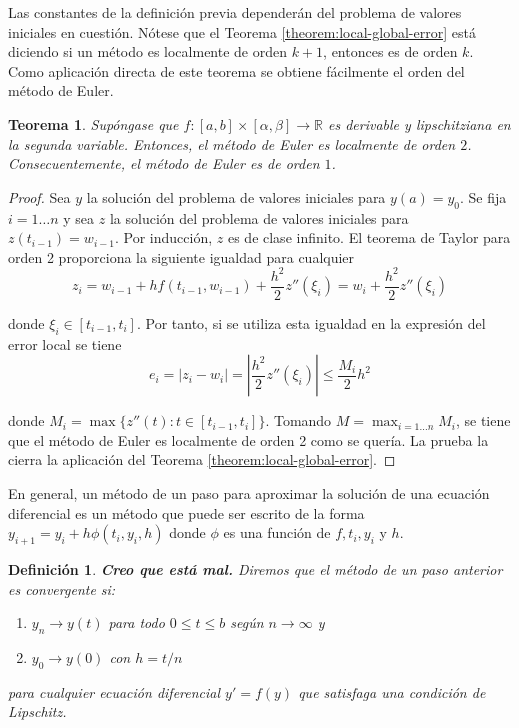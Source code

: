\documentclass{article}
\theoremstyle{theorem-style}  %
\newtheorem{theorem}{Teorema}[section]  %
\theoremstyle{definition-style}
\newtheorem{definition}{Definición}[section]
\theoremstyle{example-style}
\begin{document}
	Las constantes de la definición previa dependerán del problema de valores iniciales en cuestión. Nótese que el Teorema \ref{theorem:local-global-error} está diciendo si un método es localmente de orden $k+1$, entonces es de orden $k$. Como aplicación directa de este teorema se obtiene fácilmente el orden del método de Euler.
	
	\begin{theorem} \label{theorem:euler:error}
		Supóngase que $f: [a,b] \times [\alpha, \beta] \rightarrow \mathbb{R}$ es derivable y lipschitziana en la segunda variable. Entonces, el método de Euler es localmente de orden $2$. Consecuentemente, el método de Euler es de orden $1$.
	\end{theorem}
	
	\begin{proof}
		Sea $y$ la solución del problema de valores iniciales para $y(a) = y_0$. Se fija $i = 1 \ldots n$ y sea $z$ la solución del problema de valores iniciales para $z(t_{i-1}) = w_{i-1}$. Por inducción, $z$ es de clase infinito. El teorema de Taylor para orden 2 proporciona la siguiente igualdad para cualquier 
		\begin{equation}
			z_i= w_{i-1} + h f(t_{i-1}, w_{i-1}) + \frac{h^2}{2} z''(\xi_i) = w_i + \frac{h^2}{2} z''(\xi_i)
		\end{equation}

		donde $\xi_i \in [t_{i-1}, t_i]$. Por tanto, si se utiliza esta igualdad en la expresión del error local se tiene
		\begin{equation}
			e_i = |z_i - w_i| = \left|\frac{h^2}{2} z''(\xi_i)\right| \le \frac{M_i}{2} h^2
		\end{equation}

		donde $M_i = \max\{z''(t) : t \in [t_{i-1}, t_i]\}$. Tomando $M = \max_{i = 1 \ldots n} M_i$, se tiene que el método de Euler es localmente de orden 2 como se quería. La prueba la cierra la aplicación del Teorema \ref{theorem:local-global-error}.
	\end{proof}
	
	En general, un método de un paso para aproximar la solución de una ecuación diferencial es un método que puede ser escrito de la forma $y_{i+1}=y_i + h \phi(t_i,y_i,h)$ donde $\phi$ es una función de $f, t_i, y_i$ y $h$. 
	
	\begin{definition}
		\textbf{Creo que está mal.} Diremos que el método de un paso anterior es convergente si:
		\begin{enumerate}
			\item $y_n \to y(t)$ para todo $0 \le t \le b$ según $n \to \infty$ y 
			\item $y_0 \to y(0)$ con $h=t/n$
		\end{enumerate}
		para cualquier ecuación diferencial $y'=f(y)$ que satisfaga una condición de Lipschitz.
	\end{definition}
	
\end{document}
